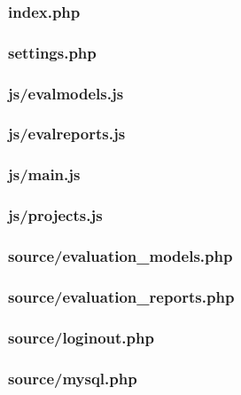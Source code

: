 \documentclass[12pt,a4paper,spanish,twoside]{article}
\begin{document}
\subsubsection{index.php}


\subsubsection{settings.php}


\subsubsection{js/evalmodels.js}


\subsubsection{js/evalreports.js}


\subsubsection{js/main.js}


\subsubsection{js/projects.js}


\subsubsection{source/evaluation\_models.php}


\subsubsection{source/evaluation\_reports.php}


\subsubsection{source/loginout.php}


\subsubsection{source/mysql.php}

\end{document}
